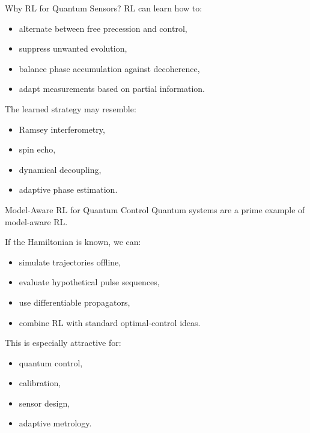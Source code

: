 \documentclass{beamer}
\begin{document}
\begin{frame}{Why RL for Quantum Sensors?}
  RL can learn how to:
  \begin{itemize}
  \item alternate between free precession and control,
  \item suppress unwanted evolution,
  \item balance phase accumulation against decoherence,
  \item adapt measurements based on partial information.
  \end{itemize}

  The learned strategy may resemble:
  \begin{itemize}
  \item Ramsey interferometry,
  \item spin echo,
  \item dynamical decoupling,
  \item adaptive phase estimation.
  \end{itemize}
\end{frame}

\begin{frame}{Model-Aware RL for Quantum Control}
  Quantum systems are a prime example of model-aware RL.

  If the Hamiltonian is known, we can:
  \begin{itemize}
  \item simulate trajectories offline,
  \item evaluate hypothetical pulse sequences,
  \item use differentiable propagators,
  \item combine RL with standard optimal-control ideas.
  \end{itemize}

  This is especially attractive for:
  \begin{itemize}
  \item quantum control,
  \item calibration,
  \item sensor design,
  \item adaptive metrology.
  \end{itemize}
\end{frame}
\end{document}
